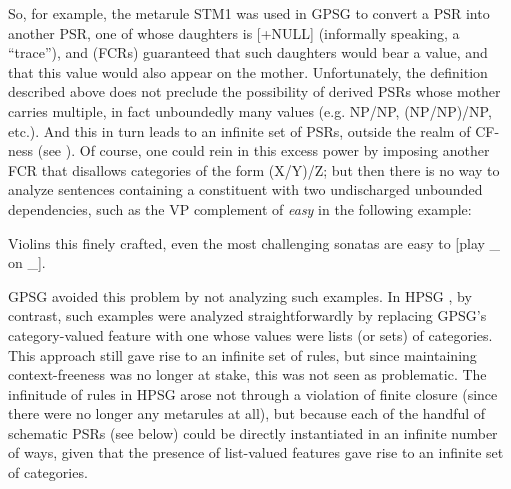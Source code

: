 \documentclass[output=paper
 	        ,biblatex
                ,babelshorthands
                ,newtxmath
                ,draftmode
                ,colorlinks, citecolor=brown
]{langscibook}
\begin{document}
So, for example, the metarule STM1 was used in GPSG to convert a PSR into another PSR, one of whose daughters is [+NULL] (informally speaking, a ``trace''), and  (FCRs) guaranteed that such daughters would bear a \slasch value, and that this \slasch value would also appear on the mother. Unfortunately, the  definition described above does not preclude the possibility of derived PSRs whose mother carries multiple, in fact unboundedly many
\slasch values (e.g. NP/NP, (NP/NP)/NP, etc.). And this in turn leads to an infinite set of PSRs, outside the realm of CF-ness (see \citealt{Ristad86}).  Of course, one could rein in this excess power by imposing another FCR that disallows categories of the form (X/Y)/Z; but then there is no way to analyze sentences containing a constituent with two undischarged unbounded dependencies, such as the VP complement of \emph{easy} in the following example:

\ea
\label{ex-violins}
Violins this finely crafted, even the most challenging sonatas are easy to [play \_ on \_]. 
\z

\noindent
GPSG avoided this problem by not analyzing such examples. In HPSG \citep{Pollard85a-u}, by contrast, such examples were analyzed straightforwardly by replacing GPSG's category-valued \slasch feature with one whose values were lists (or sets) of categories. This approach still gave rise to an infinite set of rules, but since maintaining context-freeness was no longer at stake, this was not seen as problematic. The infinitude of rules in HPSG arose not through a violation of finite closure (since there were no longer any metarules at all), but because each of the handful of schematic PSRs (see below) could be directly instantiated in an infinite number of ways, given that the presence of list-valued
features gave rise to an infinite set of categories.
\end{document}
